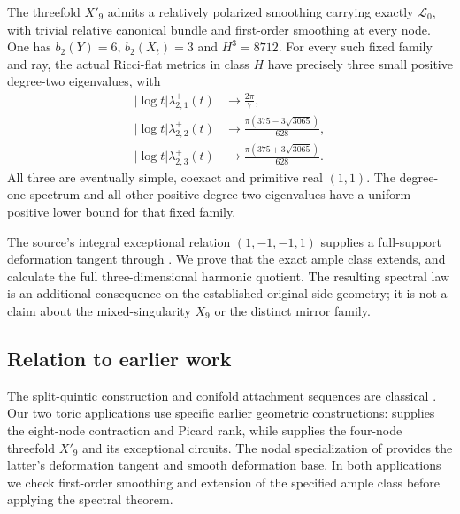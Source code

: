 \begin{corollary}\label{cor:x9}
The threefold $X'_9$ admits a relatively polarized smoothing carrying
exactly $\mathcal L_0$, with trivial relative canonical bundle and
first-order smoothing at every node. One has $b_2(Y)=6$,
$b_2(X_t)=3$ and $H^3=8712$. For every such fixed family and ray,
the actual Ricci-flat metrics in class $H$ have precisely three small
positive degree-two eigenvalues, with
\begin{equation}\label{eq:x9-spectral-law}
\begin{split}
 |\log t|\lambda^+_{2,1}(t)&\longrightarrow\frac{2\pi}{7},\\
 |\log t|\lambda^+_{2,2}(t)&\longrightarrow
       \frac{\pi(375-3\sqrt{3065})}{628},\\
 |\log t|\lambda^+_{2,3}(t)&\longrightarrow
       \frac{\pi(375+3\sqrt{3065})}{628}.
\end{split}
\end{equation}
All three are eventually simple, coexact and primitive real $(1,1)$.
The degree-one spectrum and all other positive degree-two eigenvalues
have a uniform positive lower bound for that fixed family.
\end{corollary}

The source's integral exceptional relation $(1,-1,-1,1)$ supplies a
full-support deformation tangent through
\cite[Theorems~2.5 and~4.5]{wuebben-cy-smoothing}. We prove that the
exact ample class extends, and calculate the full three-dimensional
harmonic quotient. The resulting spectral law is an additional
consequence on the established original-side geometry; it is not a
claim about the mixed-singularity $X_9$ or the distinct mirror family.

\subsection{Relation to earlier work}
The split-quintic construction and conifold attachment sequences are
classical \cite{greene-morrison-strominger,rossi,lee-lin-wang}.
Our two toric applications use specific earlier geometric constructions:
\cite[Appendix~A, Proposition~A.1]{wuebben-chambers} supplies the eight-node
contraction and Picard rank, while \cite[Section~11.1]{wuebben-cy-mirror}
supplies the four-node threefold $X'_9$ and its exceptional circuits.
The nodal specialization of \cite[Theorems~2.5 and~4.5]{wuebben-cy-smoothing}
provides the latter's deformation tangent and smooth deformation base.
In both applications we check first-order smoothing and extension of the
specified ample class before applying the spectral theorem.

